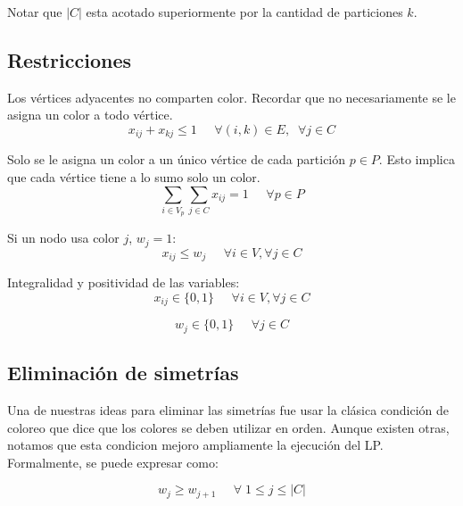 Notar que $|C|$ esta acotado superiormente por la cantidad de particiones $k$.

\vspace{10px}

\subsection{Restricciones}
\label{restricciones}

Los vértices adyacentes no comparten color. Recordar que no necesariamente se le asigna un color a todo vértice.
\begin{equation}
x_{ij} + x_{kj} \leq 1 \;\;\;\;\; \forall (i,k) \in E,\;\; \forall j \in C
\end{equation}

Solo se le asigna un color a un único vértice de cada partición $p \in P$. Esto implica que cada vértice tiene a lo sumo solo un color.
\begin{equation}
\sum_{i \in V_p} \sum_{j \in C} x_{ij} = 1 \;\;\;\;\; \forall p \in P
\end{equation}

Si un nodo usa color $j$, $w_j = 1$:
\begin{equation}
x_{ij} \leq w_j \;\;\;\;\; \forall i \in V, \forall j \in C
\end{equation}

Integralidad y positividad de las variables:
\begin{equation}
x_{ij} \in \{0,1\} \;\;\;\;\; \forall i \in V, \forall j \in C
\end{equation}

\begin{equation}
w_j \in \{0,1\} \;\;\;\;\; \forall j \in C
\end{equation}

\subsection{Eliminación de simetrías}

Una de nuestras ideas para eliminar las simetrías fue usar la clásica condición de coloreo que dice que los colores se deben utilizar en orden. Aunque existen otras, notamos que esta condicion mejoro ampliamente la ejecución del LP. Formalmente, se puede expresar como:

\begin{equation}
w_j \geq w_{j+1} \;\;\;\;\; \forall \; 1 \leq j \leq |C|
\end{equation}
